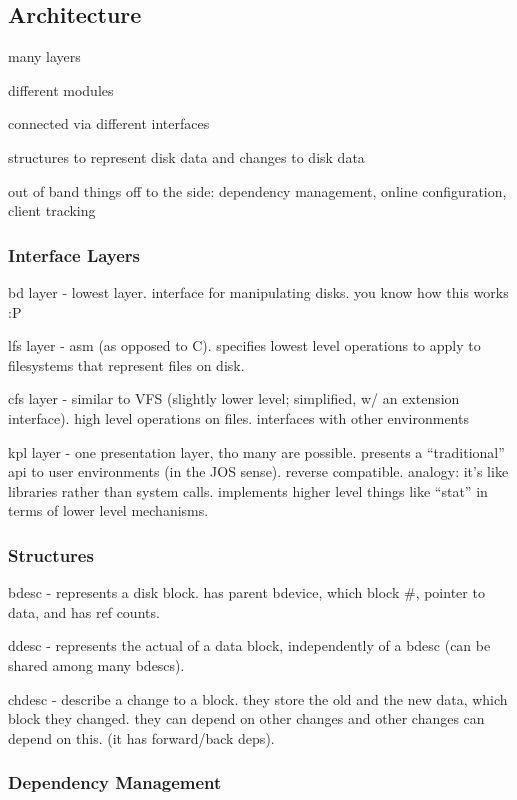 \subsection{Architecture}
\label{subsec:arch}

many layers

different modules

connected via different interfaces

structures to represent disk data and changes to disk data

out of band things off to the side: dependency management, online
configuration, client tracking

\subsubsection{Interface Layers}

bd layer - lowest layer. interface for manipulating disks. you know
how this works :P

lfs layer - asm (as opposed to C). specifies lowest level operations
to apply to filesystems that represent files on disk.

cfs layer - similar to VFS (slightly lower level; simplified, w/ an
extension interface). high level operations on files. interfaces with
other environments

kpl layer - one presentation layer, tho many are possible. presents a
``traditional'' api to user environments (in the JOS sense). reverse
compatible. analogy: it's like libraries rather than system
calls. implements higher level things like ``stat'' in terms of lower
level mechanisms.

\subsubsection{Structures}

bdesc - represents a disk block. has parent bdevice, which block \#,
pointer to data, and has ref counts.

ddesc - represents the actual of a data block, independently of a
bdesc (can be shared among many bdescs).

chdesc - describe a change to a block. they store the old and the new
data, which block they changed. they can depend on other changes and
other changes can depend on this. (it has forward/back deps).

\subsubsection{Dependency Management}

